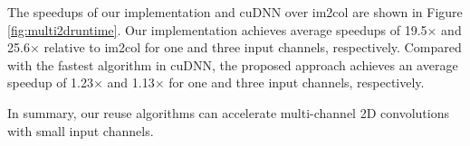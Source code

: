 The speedups of our implementation and cuDNN over im2col are shown
in Figure \ref{fig:multi2druntime}. Our
implementation achieves average speedups of 19.5$\times$ and 25.6$\times$ relative to im2col for one and three input channels, respectively. Compared with the fastest algorithm in cuDNN, the proposed approach achieves an average speedup of 1.23$\times$ and 1.13$\times$ for one and three input channels, respectively.

In summary, our reuse algorithms can accelerate multi-channel 2D convolutions with small input channels.
